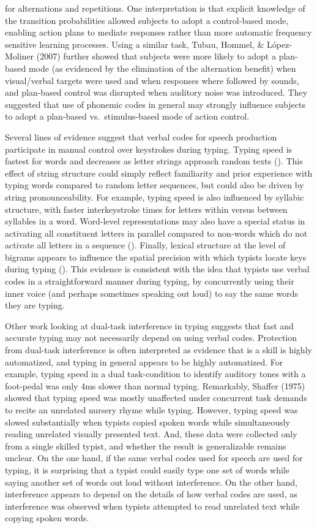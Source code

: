 \documentclass[floatsintext,man]{apa6}
\theoremstyle{definition}
\theoremstyle{definition}
\theoremstyle{definition}
\theoremstyle{remark}
\begin{document}
for alternations and repetitions. One interpretation is that explicit
knowledge of the transition probabilities allowed subjects to adopt a
control-based mode, enabling action plans to mediate responses rather
than more automatic frequency sensitive learning processes. Using a
similar task, Tubau, Hommel, \& López-Moliner (2007) further showed that
subjects were more likely to adopt a plan-based mode (as evidenced by
the elimination of the alternation benefit) when visual/verbal targets
were used and when responses where followed by sounds, and plan-based
control was disrupted when auditory noise was introduced. They suggested
that use of phonemic codes in general may strongly influence subjects to
adopt a plan-based vs.~stimulus-based mode of action control.

Several lines of evidence suggest that verbal codes for speech
production participate in manual control over keystrokes during typing.
Typing speed is fastest for words and decreases as letter strings
approach random texts (). This effect of string structure could simply
reflect familiarity and prior experience with typing words compared to
random letter sequences, but could also be driven by string
pronounceability. For example, typing speed is also influenced by
syllabic structure, with faster interkeystroke times for letters within
versus between syllables in a word. Word-level representations may also
have a special status in activating all constituent letters in parallel
compared to non-words which do not activate all letters in a sequence
(). Finally, lexical structure at the level of bigrams appears to
influence the spatial precision with which typists locate keys during
typing (). This evidence is consistent with the idea that typists use
verbal codes in a straightforward manner during typing, by concurrently
using their inner voice (and perhaps sometimes speaking out loud) to say
the same words they are typing.

Other work looking at dual-task interference in typing suggests that
fast and accurate typing may not necessarily depend on using verbal
codes. Protection from dual-task interference is often interpreted as
evidence that is a skill is highly automatized, and typing in general
appears to be highly automatized. For example, typing speed in a dual
task-condition to identify auditory tones with a foot-pedal was only 4ms
slower than normal typing. Remarkably, Shaffer (1975) showed that typing
speed was mostly unaffected under concurrent task demands to recite an
unrelated nursery rhyme while typing. However, typing speed was slowed
substantially when typists copied spoken words while simultaneously
reading unrelated visually presented text. And, these data were
collected only from a single skilled typist, and whether the result is
generalizable remains unclear. On the one hand, if the same verbal codes
used for speech are used for typing, it is surprising that a typist
could easily type one set of words while saying another set of words out
loud without interference. On the other hand, interference appears to
depend on the details of how verbal codes are used, as interference was
observed when typists attempted to read unrelated text while copying
spoken words.
\end{document}
